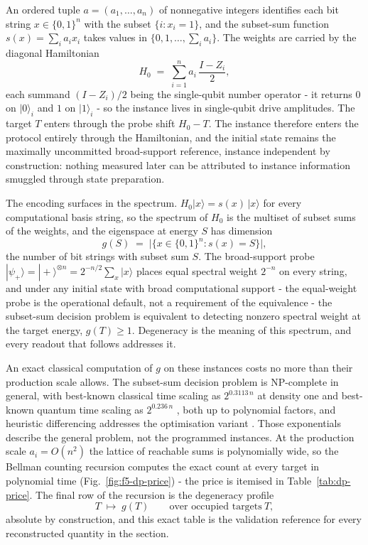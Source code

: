 An ordered tuple $a = (a_1, \dots, a_n)$ of nonnegative integers identifies each bit string $x \in \{0,1\}^n$ with the subset $\{i : x_i = 1\}$, and the subset-sum function $s(x) = \sum_i a_i x_i$ takes values in $\{0, 1, \dots, \sum_i a_i\}$. The weights are carried by the diagonal Hamiltonian
\[
H_0 \;=\; \sum_{i=1}^{n} a_i\, \frac{I - Z_i}{2},
\]
each summand $(I - Z_i)/2$ being the single-qubit number operator - it returns $0$ on $|0\rangle_i$ and $1$ on $|1\rangle_i$ - so the instance lives in single-qubit drive amplitudes. The target $T$ enters through the probe shift $H_0 - T$. The instance therefore enters the protocol entirely through the Hamiltonian, and the initial state remains the maximally uncommitted broad-support reference, instance independent by construction: nothing measured later can be attributed to instance information smuggled through state preparation.

The encoding surfaces in the spectrum. $H_0 |x\rangle = s(x)\, |x\rangle$ for every computational basis string, so the spectrum of $H_0$ is the multiset of subset sums of the weights, and the eigenspace at energy $S$ has dimension
\[
g(S) \;=\; \bigl|\{x \in \{0,1\}^n : s(x) = S\}\bigr|,
\]
the number of bit strings with subset sum $S$. The broad-support probe $|\psi_+\rangle = |+\rangle^{\otimes n} = 2^{-n/2} \sum_x |x\rangle$ places equal spectral weight $2^{-n}$ on every string, and under any initial state with broad computational support - the equal-weight probe is the operational default, not a requirement of the equivalence - the subset-sum decision problem is equivalent to detecting nonzero spectral weight at the target energy, $g(T) \ge 1$. Degeneracy is the meaning of this spectrum, and every readout that follows addresses it.

An exact classical computation of $g$ on these instances costs no more than their production scale allows. The subset-sum decision problem is NP-complete in general, with best-known classical time scaling as $2^{0.3113\, n}$ at density one \cite{hgj2010} and best-known quantum time scaling as $2^{0.236\, n}$ \cite{bonnetain2020improved}, both up to polynomial factors, and heuristic differencing addresses the optimisation variant \cite{karmarkar1982differencing}. Those exponentials describe the general problem, not the programmed instances. At the production scale $a_i = O(n^2)$ the lattice of reachable sums is polynomially wide, so the Bellman counting recursion \cite{bellman1957dp} computes the exact count at every target in polynomial time (Fig.~\ref{fig:f5-dp-price}) - the price is itemised in Table~\ref{tab:dp-price}. The final row of the recursion is the degeneracy profile
\[
T \;\longmapsto\; g(T) \qquad \text{over occupied targets}\ T,
\]
absolute by construction, and this exact table is the validation reference for every reconstructed quantity in the section.

